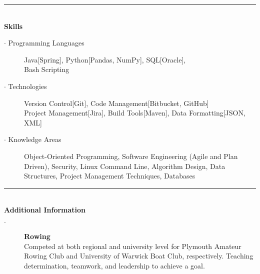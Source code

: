 \documentclass[12pt, a4paper]{article}
\begin{document}
    \vspace{-2ex}
    \noindent\rule{8cm}{0.4pt} \\
    \textbf{Skills}
    \begin{description}
        \item[$\cdot$ Programming Languages]  Java[Spring],
        Python[Pandas, NumPy],
        SQL[Oracle],
        \\Bash Scripting
        \item[$\cdot$ Technologies] Version Control[Git],
        Code Management[Bitbucket, GitHub]
        \\Project Management[Jira],
        Build Tools[Maven],
        Data Formatting[JSON, XML]
        \item[$\cdot$ Knowledge Areas] Object-Oriented Programming,
        Software Engineering (Agile and Plan Driven),
        Security,
        Linux Command Line,
        Algorithm Design,
        Data Structures,
        Project Management Techniques,
        Databases
    \end{description}

    \vspace{-2ex}
    \noindent\rule{8cm}{0.4pt} \\
    \textbf{Additional Information}
    \begin{description}
        \item[$\cdot$] \textbf{Rowing} \\Competed at both regional and university level for Plymouth Amateur Rowing Club and University of Warwick Boat Club, respectively. Teaching determination, teamwork, and leadership to achieve a goal.

        \iffalse
        Rowing has taught me the value of team work, and has given me transferable skills including resilience, decision making, and precision, all of which I bring to the workplace.
        Time management $\cdot$ Team work $\cdot$ Resilience $\cdot$ Motivational skills $\cdot$ Quick thinking \\ $\cdot$ Technical planning $\cdot$ Precision
        \fi

    \end{description}
\end{document}
